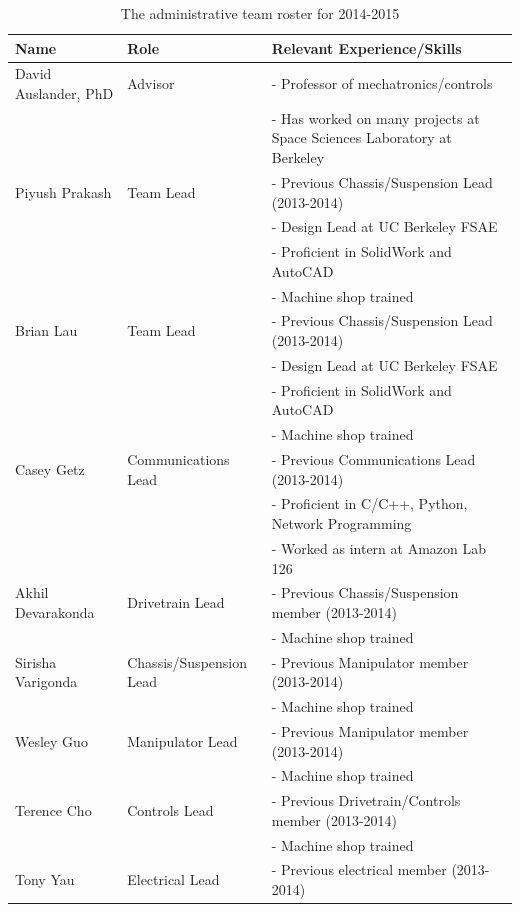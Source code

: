 \documentclass[titlepage,twocolumn,10pt]{article}
\begin{document}
    \begin{table}[P]
        \begin{tabular*}{\textwidth}{l  l  l}
            \textbf{Name} & \textbf{Role} & \textbf{Relevant Experience/Skills} \\
            \hline \hline
            David Auslander, PhD & Advisor & - Professor of mechatronics/controls \\
            & & - Has worked on many projects at Space Sciences Laboratory at Berkeley \\
            \hline
            Piyush Prakash & Team Lead & - Previous Chassis/Suspension Lead (2013-2014) \\
            & & - Design Lead at UC Berkeley FSAE \\
            & & - Proficient in SolidWork and AutoCAD \\
            & & - Machine shop trained \\
            \hline
            Brian Lau & Team Lead & - Previous Chassis/Suspension Lead (2013-2014) \\
            & & - Design Lead at UC Berkeley FSAE \\
            & & - Proficient in SolidWork and AutoCAD \\
            & & - Machine shop trained \\
            \hline
            Casey Getz & Communications Lead & - Previous Communications Lead (2013-2014) \\
            & & - Proficient in C/C++, Python, Network Programming\\
            & & - Worked as intern at Amazon Lab 126 \\
            \hline
            Akhil Devarakonda & Drivetrain Lead & - Previous Chassis/Suspension member (2013-2014) \\
            & & - Machine shop trained \\
            \hline
            Sirisha Varigonda & Chassis/Suspension Lead & - Previous Manipulator member (2013-2014) \\
            & & - Machine shop trained \\
            \hline
            Wesley Guo & Manipulator Lead & - Previous Manipulator member (2013-2014) \\
            & & - Machine shop trained \\
            \hline
            Terence Cho & Controls Lead & - Previous Drivetrain/Controls member (2013-2014) \\
            & & - Machine shop trained \\
            \hline
            Tony Yau & Electrical Lead & - Previous electrical member (2013-2014) \\
        \end{tabular*}
        \caption{The administrative team roster for 2014-2015}
    \end{table}
\end{document}
